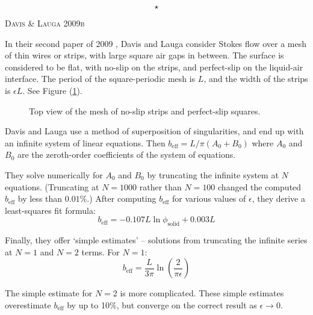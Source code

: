 \documentclass[12pt, a4paper, twoside, openright]{book}
\newcommand{\beff}{\ensuremath{b_{\mathrm{eff}}}}
\newcommand{\phisol}{\ensuremath{\phi_{\mathrm{solid}}}}
\newcommand{\sep}{\begin{equation*} \star \end{equation*}}
\newcommand{\paper}[1]
         {\colorbox[gray]{0.8}{ \textsc{#1}}
         
         }
\begin{document}
\sep

\paper{Davis \& Lauga 2009b}
In their second paper of 2009 \cite{DavisLauga2009b}, Davis and Lauga consider Stokes flow over a mesh of thin wires or strips, with large square air gaps in between.  The surface is considered to be flat, with no-slip on the strips, and perfect-slip on the liquid-air interface.  The period of the square-periodic mesh is $L$, and the width of the strips is $\epsilon L$.  See Figure (\ref{mesh}).

\begin{figure}[ht]
\centering
{}
\caption{Top view of the mesh of no-slip strips and perfect-slip squares.}
\label{mesh}
\end{figure}

Davis and Lauga use a method of superposition of singularities, and end up with an infinite system of linear equations.  Then $\beff = L/\pi (A_0 + B_0)$ where $A_0$ and $B_0$ are the zeroth-order coefficients of the system of equations.

They solve numerically for $A_0$ and $B_0$ by truncating the infinite system at $N$ equations.  (Truncating at $N=1000$ rather than $N=100$ changed the computed $\beff$ by less than $0.01\%$.) After computing $\beff$ for various values of $\epsilon$, they derive a least-squares fit formula:
\begin{equation}
\beff = -0.107 L \ln \phisol + 0.003L
\end{equation}

Finally, they offer `simple estimates' -- solutions from truncating the infinite series at $N=1$ and $N=2$ terms. For $N=1$:
\begin{equation}
\beff = \frac{L}{3\pi} \ln \left( \frac{2}{\pi \epsilon} \right)
\end{equation}

The simple estimate for $N=2$ is more complicated.  These simple estimates overestimate $\beff$ by up to 10\%, but converge on the correct result as $\epsilon \rightarrow 0$.
\end{document}
